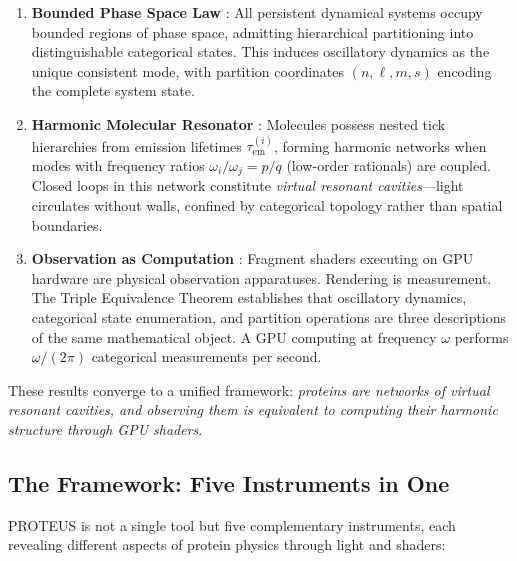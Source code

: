 \documentclass[11pt,a4paper]{article}
\begin{document}
\begin{enumerate}
\item \textbf{Bounded Phase Space Law} \cite{Paper6}: All persistent dynamical systems occupy bounded regions of phase space, admitting hierarchical partitioning into distinguishable categorical states. This induces oscillatory dynamics as the unique consistent mode, with partition coordinates $(n, \ell, m, s)$ encoding the complete system state.

\item \textbf{Harmonic Molecular Resonator} \cite{Paper10}: Molecules possess nested tick hierarchies from emission lifetimes $\tau_{\text{em}}^{(i)}$, forming harmonic networks when modes with frequency ratios $\omega_i/\omega_j = p/q$ (low-order rationals) are coupled. Closed loops in this network constitute \textit{virtual resonant cavities}—light circulates without walls, confined by categorical topology rather than spatial boundaries.

\item \textbf{Observation as Computation} \cite{Paper8,Paper9}: Fragment shaders executing on GPU hardware are physical observation apparatuses. Rendering is measurement. The Triple Equivalence Theorem establishes that oscillatory dynamics, categorical state enumeration, and partition operations are three descriptions of the same mathematical object. A GPU computing at frequency $\omega$ performs $\omega/(2\pi)$ categorical measurements per second.
\end{enumerate}

These results converge to a unified framework: \textit{proteins are networks of virtual resonant cavities, and observing them is equivalent to computing their harmonic structure through GPU shaders}.

\subsection{The Framework: Five Instruments in One}

PROTEUS is not a single tool but five complementary instruments, each revealing different aspects of protein physics through light and shaders:
\end{document}
